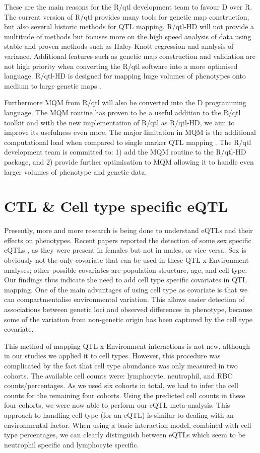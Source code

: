 These are the main reasons for the R/qtl development team to favour D over R. The current version of R/qtl provides many tools for genetic map 
construction, but also several historic methods for QTL mapping. R/qtl-HD will not provide a multitude of methods but focuses more on the high 
speed analysis of data using stable and proven methods such as Haley-Knott regression \cite{Haley:1992} and analysis of variance. Additional features such 
as genetic map construction and validation are not high priority when converting the R/qtl software into a more optimised language. R/qtl-HD 
is designed for mapping huge volumes of phenotypes onto medium to large genetic maps \cite{Trelles:2011}.

Furthermore MQM from R/qtl will also be converted into the D programming language. The MQM routine has proven to be a useful addition to the R/qtl 
toolkit and with the new implementation of R/qtl as R/qtl-HD, we aim to improve its usefulness even more. The major limitation in MQM is the additional 
computational load when compared to single marker QTL mapping \cite{Arends:2010}. The R/qtl development team is committed to: 1) add the MQM routine to the 
R/qtl-HD package, and 2) provide further optimisation to MQM allowing it to handle even larger volumes of phenotype and genetic data.

\section{CTL & Cell type specific eQTL}
Presently, more and more research is being done to understand eQTLs and their effects on phenotypes. Recent papers reported the detection of some sex 
specific eQTLs \cite{Ramos:1999, Bernatchez:2008, Lusis:2010}, as they were present in females but not in males, or vice versa. Sex is obviously not 
the only covariate that can be used in these QTL x Environment analyses; other possible covariates are population structure, age, and cell type. Our 
findings thus indicate the need to add cell type specific covariates in QTL mapping. One of the main advantages of using cell type as covariate is 
that we can compartmentalise environmental variation. This allows easier detection of associations between genetic loci and observed differences in 
phenotype, because some of the variation from non-genetic origin has been captured by the cell type covariate.

This method of mapping QTL x Environment interactions is not new, although in our studies we applied it to cell types. However, this procedure was 
complicated by the fact that cell type abundance was only measured in two cohorts. The available cell counts were: lymphocyte, neutrophil, and RBC 
counts/percentages. As we used six cohorts in total, we had to infer the cell counts for the remaining four cohorts. Using the predicted cell counts 
in these four cohorts, we were now able to perform our eQTL meta-analysis. This approach to handling cell type (for an eQTL) is similar to dealing 
with an environmental factor. When using a basic interaction model, combined with cell type percentages, we can clearly distinguish between eQTLs 
which seem to be neutrophil specific and lymphocyte specific.

